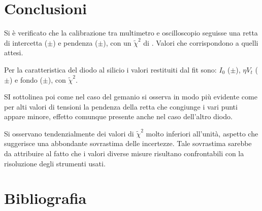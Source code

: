 \documentclass[a4paper,11pt]{article}
\begin{document}
\section{Conclusioni}

Si è verificato che la calibrazione tra multimetro e oscilloscopio seguisse una retta di intercetta ($\pm$) e pendenza ($\pm$), con un $\tilde\chi^2$ di . Valori che corrispondono a quelli attesi.

Per la caratteristica del diodo al silicio i valori restituiti dal fit sono: $I_0$ ($\pm$), $\eta V_t$ ($\pm$) e fondo ($\pm$), con $\tilde\chi^2$. 

 SI sottolinea poi come nel caso del gemanio si osserva in modo più evidente come per alti valori di tensioni la pendenza della retta che congiunge i vari punti appare minore, effetto comunque presente anche nel caso dell'altro diodo.


Si osservano tendenzialmente dei valori di $\tilde\chi^2$ molto inferiori all'unità, aspetto che suggerisce una abbondante sovrastima delle incertezze. Tale sovrastima sarebbe da attribuire al fatto che i valori diverse misure risultano confrontabili con la risoluzione degli strumenti usati. 

\section{Bibliografia}
\end{document}
